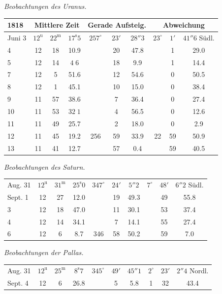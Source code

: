 \begin{center}
\emph{Beobachtungen des Uranus.}

\setlength{\tabcolsep}{2.2pt}\begin{tabular}{l|ccc|ccc|ccc}
\hline
1818 & \multicolumn{3}{c|}{Mittlere Zeit} & \multicolumn{3}{c|}{Gerade Aufsteig.} & \multicolumn{3}{c}{Abweichung} \\
\hline
Juni 3 & $12^{\mathrm u}$ & $22^{\mathrm m}$ & $17^{\mathrm s}5$ & $257^\circ$ & $23'$ & $28''3$ & $23^\circ$ & $1'$ & $41''6$ Südl. \\ 
4 & 12 & 18 & 10.9 & & 20 & 47.8 & & 1 & 29.0 \\
5 & 12 & 14 & $4\;6$ & & 18 & 9.9 & & 1 & 14.4 \\
7 & 12 & 5 & 51.6 & & 12 & 54.6 & & 0 & 50.5 \\ 
8 & 12 & 1 & 45.1 & & 10 & 15.0 & & 0 & 38.4 \\
9 & 11 & 57 & 38.6 & & 7 & 36.4 & & 0 & 27.4 \\
10 & 11 & 53 & $32\;1$ & & 4 & 56.5 & & 0 & 12.6 \\
11 & 11 & 49 & 25.7 & & 2 & 18.0 & & 0 & 2.9 \\
12 & 11 & 45 & 19.2 & 256 & 59 & 33.9 & 22 & 59 & 50.9 \\
13 & 11 & 41 & 12.7 & & 57 & 0.4 & & 59 & 40.5 \\
\hline
\end{tabular}
\end{center}

\begin{center}
\emph{Beobachtungen des Saturn.}

\setlength{\tabcolsep}{2.2pt}\begin{tabular}{l|ccc|ccc|ccc}
\hline
Aug. 31 & $12^{\mathrm u}$ & $31^{\mathrm m}$ & $25^{\mathrm s}0$ & $347^\circ$ & $24'$ & $5''2$ & $7^\circ$ & $48'$ & $6''2$ Südl. \\
Sept. 1 & 12 & 27 & 12.0 & & 19 & 49.3 & & 49 & 55.8 \\
3 & 12 & 18 & 47.0 & & 11 & 30.1 & & 53 & 37.4 \\
4 & 12 & 14 & 34.1 & & 7 & 14.1 & & 55 & 27.4 \\
6 & 12 & 6 & 8.7 & 346 & 58 & 50.2 & & 59 & 7.0 \\
\hline
\end{tabular}
\end{center}

\begin{center}
\emph{Beobachtungen der Pallas.}

\setlength{\tabcolsep}{2.2pt}\begin{tabular}{l|ccc|ccc|ccc}
\hline
Aug. 31 & $12^{\mathrm u}$ & $25^{\mathrm m}$ & $8^{\mathrm s}7$ & $345^\circ$ & $49'$ & $45''1$ & $2^\circ$ & $23'$ & $2''4$ Nordl. \\
Sept. 4 & 12 & 6 & 26.8 & & 5 & 5.8 & 1 & 32 & 43.4 \\
\hline
\end{tabular}
\end{center}

